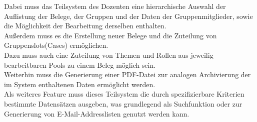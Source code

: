 \documentclass{article}
\begin{document}
Dabei muss das Teilsystem des Dozenten eine hierarchische Auswahl der Auflistung der Belege, der Gruppen und der Daten der Gruppenmitglieder, sowie die Möglichkeit der Bearbeitung derselben enthalten.\\
Außerdem muss es die Erstellung neuer Belege und die Zuteilung von Gruppenslots(Cases) ermöglichen.\\
Dazu muss auch eine Zuteilung von Themen und Rollen aus jeweilig bearbeitbaren Pools zu einem Beleg möglich sein.\\
Weiterhin muss die Generierung einer PDF-Datei zur analogen Archivierung der im System enthaltenen Daten ermöglicht werden.\\
Als weiteres Feature muss dieses Teilsystem die durch spezifizierbare Kriterien bestimmte Datensätzen ausgeben, was grundlegend als Suchfunktion oder zur Generierung von E-Mail-Addresslisten genutzt werden kann.
\end{document}
